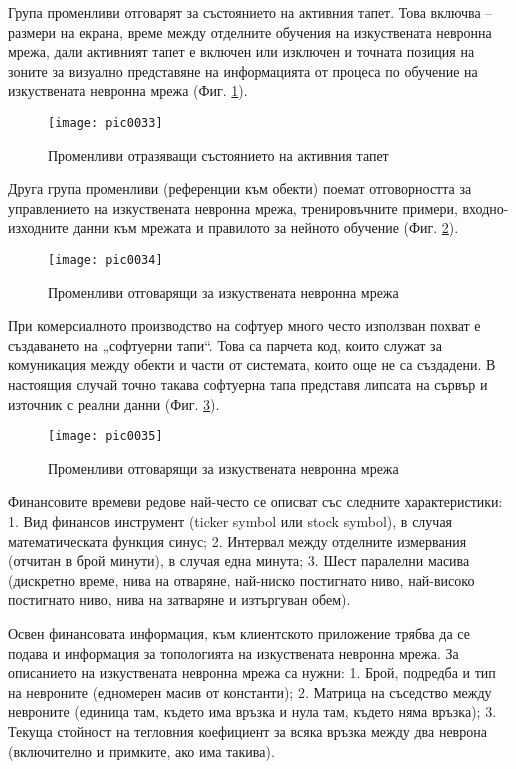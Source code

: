 Група променливи отговарят за състоянието на активния тапет. Това включва – размери на екрана, време между отделните обучения на изкуствената невронна мрежа, дали активният тапет е включен или изключен и точната позиция на зоните за визуално представяне на информацията от процеса по обучение на изкуствената невронна мрежа (Фиг. \ref{fig:pic0033}). 

\begin{figure}[h]
  \centering
  \texttt{[image: pic0033]}
  \caption{Променливи отразяващи състоянието на активния тапет}
\label{fig:pic0033}
\end{figure}
\FloatBarrier

Друга група променливи (референции към обекти) поемат отговорността за управлението на изкуствената невронна мрежа, тренировъчните примери, входно-изходните данни към мрежата и правилото за нейното обучение (Фиг. \ref{fig:pic0034}).

\begin{figure}[h]
  \centering
  \texttt{[image: pic0034]}
  \caption{Променливи отговарящи за изкуствената невронна мрежа}
\label{fig:pic0034}
\end{figure}
\FloatBarrier

При комерсиалното производство на софтуер много често използван похват е създаването на „софтуерни тапи“. Това са парчета код, които служат за комуникация между обекти и части от системата, които още не са създадени. В настоящия случай точно такава софтуерна тапа представя липсата на сървър и източник с реални данни  (Фиг. \ref{fig:pic0035}).  

\begin{figure}[h]
  \centering
  \texttt{[image: pic0035]}
  \caption{Променливи отговарящи за изкуствената невронна мрежа}
\label{fig:pic0035}
\end{figure}
\FloatBarrier

Финансовите времеви редове най-често се описват със следните характеристики: 1. Вид финансов инструмент (ticker symbol или stock symbol), в случая математическата функция синус; 2. Интервал между отделните измервания (отчитан в брой минути), в случая една минута; 3. Шест паралелни масива (дискретно време, нива на отваряне, най-ниско постигнато ниво, най-високо постигнато ниво, нива на затваряне и изтъргуван обем).

Освен финансовата информация, към клиентското приложение трябва да се подава и информация за топологията на изкуствената невронна мрежа. За описанието на изкуствената невронна мрежа са нужни: 1. Брой, подредба и тип на невроните (едномерен масив от константи); 2. Матрица на съседство между невроните (единица там, където има връзка и нула там, където няма връзка); 3. Текуща стойност на тегловния коефициент за всяка връзка между два неврона (включително и примките, ако има такива). 

